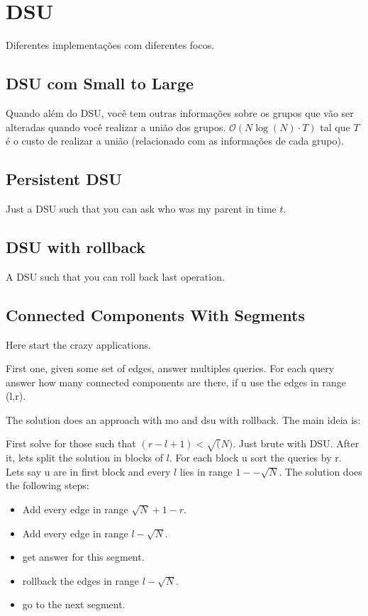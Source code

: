 \section{DSU}
Diferentes implementações com diferentes focos.

\subsection{DSU com Small to Large}
Quando além do DSU, você tem outras informações sobre os grupos que vão ser alteradas quando você realizar a união dos grupos. $\mathcal{O}(N\log(N)\cdot T)$ tal que $T$ é o custo de realizar a união (relacionado com as informações de cada grupo).

\subsection{Persistent DSU}
Just a DSU such that you can ask who was my parent in time $t$.


\subsection{DSU with rollback}
A DSU such that you can roll back last operation.


\subsection{Connected Components With Segments}

Here start the crazy applications.

First one, given some set of edges, answer multiples queries. For each query answer how many connected components are there, if u use the edges in range (l,r).

The solution does an approach with mo and dsu with rollback. The main ideia is:

First solve for those such that $(r-l+1) < \sqrt(N)$. Just brute with DSU.
After it, lets split the solution in blocks of $l$. 
For each block u sort the queries by r. Lets say u are in first block and every $l$ lies in range $1--\sqrt{N}$.
The solution does the following steps:
\begin{itemize}
    \item Add every edge in range $\sqrt{N}+1-r$.
    \item Add every edge in range $l-\sqrt{N}$.
    \item get answer for this segment.
    \item rollback the edges in range $l-\sqrt{N}$.
    \item go to the next segment.
\end{itemize}

